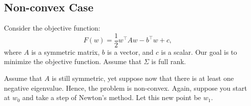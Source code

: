 \documentclass[letterpaper,11pt]{article}
\begin{document}
\subsection*{Non-convex Case}

Consider the objective function:
\begin{equation}
  F(w) = \frac{1}{2}w^\intercal A w - b^\intercal w + c,
\end{equation}
where $A$ is a symmetric matrix, $b$ is a vector, and $c$ is a scalar. Our goal
is to minimize the objective function. Assume that $\Sigma$ is full rank.

Assume that $A$ is still symmetric, yet suppose now that there is at least one
negative eigenvalue. Hence, the problem is non-convex. Again, suppose you start
at $w_0$ and take a step of Newton's method. Let this new point be $w_1$.
\end{document}
